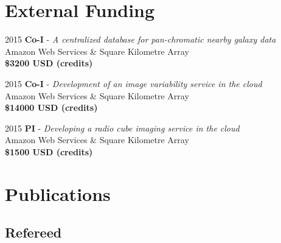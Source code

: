 \documentclass[letterpaper,11pt]{article}
\newlength{\mainindent} \setlength{\mainindent}{12pt}
\newlength{\contentindent} \setlength{\contentindent}{19ex}
\newenvironment{datelist}{
  \begingroup
  \raggedright
  \begin{description}[labelindent=\mainindent,leftmargin=\contentindent,
      style=sameline,font=\normalfont,topsep=0pt,partopsep=0pt,parsep=0pt,
      itemsep=4pt]
}{
  \end{description}
  \endgroup
}
\begin{document}
\section*{External Funding}
\begin{datelist}
\item[2015] \textbf{Co-I} - \emph{A centralized database for pan-chromatic nearby galaxy data} \\ Amazon Web Services \& Square Kilometre Array \\ \textbf{\$3200 USD (credits)}
\item[2015] \textbf{Co-I} - \emph{Development of an image variability service in the cloud} \\ Amazon Web Services \& Square Kilometre Array \\ \textbf{\$14000 USD (credits)}
\item[2015] \textbf{PI} - \emph{Developing a radio cube imaging service in the cloud} \\ Amazon Web Services \& Square Kilometre Array \\ \textbf{\$1500 USD (credits)}
\end{datelist}



\section*{Publications}

\subsection*{Refereed}
\end{document}
